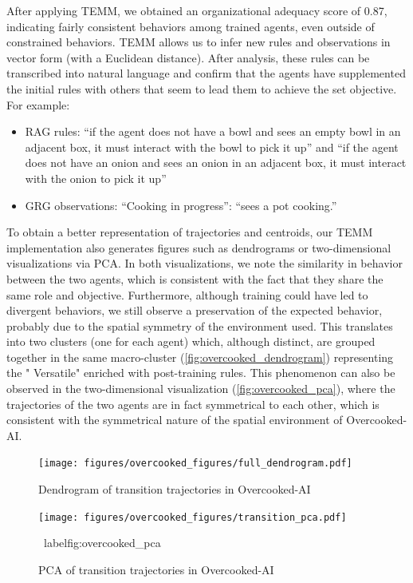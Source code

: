   After applying TEMM, we obtained an organizational adequacy score of 0.87, indicating fairly consistent behaviors among trained agents, even outside of constrained behaviors. TEMM allows us to infer new rules and observations in vector form (with a Euclidean distance). After analysis, these rules can be transcribed into natural language and confirm that the agents have supplemented the initial rules with others that seem to lead them to achieve the set objective. For example:
  \begin{itemize}
    \item RAG rules: “if the agent does not have a bowl and sees an empty bowl in an adjacent box, it must interact with the bowl to pick it up” and “if the agent does not have an onion and sees an onion in an adjacent box, it must interact with the onion to pick it up”
    \item GRG observations: “Cooking in progress”: “sees a pot cooking.”
  \end{itemize}

  To obtain a better representation of trajectories and centroids, our TEMM implementation also generates figures such as dendrograms or two-dimensional visualizations via PCA. In both visualizations, we note the similarity in behavior between the two agents, which is consistent with the fact that they share the same role and objective. Furthermore, although training could have led to divergent behaviors, we still observe a preservation of the expected behavior, probably due to the spatial symmetry of the environment used. This translates into two clusters (one for each agent) which, although distinct, are grouped together in the same macro-cluster (\autoref{fig:overcooked_dendrogram}) representing the " Versatile" enriched with post-training rules. This phenomenon can also be observed in the two-dimensional visualization (\autoref{fig:overcooked_pca}), where the trajectories of the two agents are in fact symmetrical to each other, which is consistent with the symmetrical nature of the spatial environment of Overcooked-AI.

  \begin{figure}[h!]
    \centering
    \texttt{[image: figures/overcooked\_figures/full\_dendrogram.pdf]}
    \caption{Dendrogram of transition trajectories in Overcooked-AI}
    \label {fig:overcooked_dendrogram}
  \end{figure}

  \begin{figure}[h!]
    \centering
    \texttt{[image: figures/overcooked\_figures/transition\_pca.pdf]}
    \caption{PCA of transition trajectories in Overcooked-AI}
    \ label{fig:overcooked_pca}
  \end{figure}

